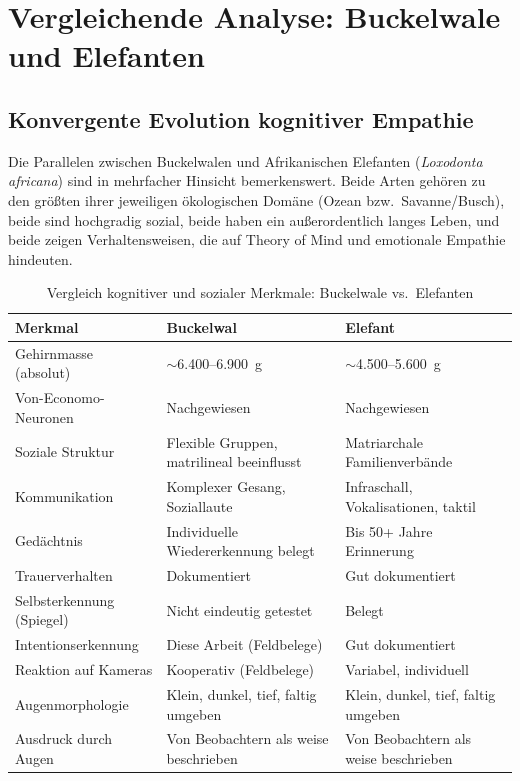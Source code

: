 ﻿\documentclass[12pt,a4paper]{article}
\theoremstyle{definition}
\theoremstyle{remark}
\begin{document}
\section{Vergleichende Analyse: Buckelwale und Elefanten}
\label{sec:elefanten}

\subsection{Konvergente Evolution kognitiver Empathie}

Die Parallelen zwischen Buckelwalen und Afrikanischen Elefanten
(\textit{Loxodonta africana}) sind in mehrfacher Hinsicht bemerkenswert.
Beide Arten gehören zu den größten ihrer jeweiligen ökologischen Domäne
(Ozean bzw.\ Savanne/Busch), beide sind hochgradig sozial, beide haben
ein außerordentlich langes Leben, und beide zeigen Verhaltensweisen, die auf
Theory of Mind und emotionale Empathie hindeuten.

\begin{table}[h]
  \centering
  \caption{Vergleich kognitiver und sozialer Merkmale: Buckelwale vs.\ Elefanten}
  \label{tab:vergleich}
  \begin{tabularx}{\textwidth}{lXX}
    \toprule
    \textbf{Merkmal} & \textbf{Buckelwal} & \textbf{Elefant} \\
    \midrule
    Gehirnmasse (absolut) & $\sim$6.400--6.900~g & $\sim$4.500--5.600~g \\
    Von-Economo-Neuronen & Nachgewiesen & Nachgewiesen \\
    Soziale Struktur & Flexible Gruppen, matrilineal beeinflusst &
      Matriarchale Familienverbände \\
    Kommunikation & Komplexer Gesang, Soziallaute & Infraschall, Vokalisationen, taktil \\
    Gedächtnis & Individuelle Wiedererkennung belegt & Bis 50+ Jahre Erinnerung \\
    Trauerverhalten & Dokumentiert & Gut dokumentiert \\
    Selbsterkennung (Spiegel) & Nicht eindeutig getestet & Belegt \\
    Intentionserkennung & Diese Arbeit (Feldbelege) & Gut dokumentiert \\
    Reaktion auf Kameras & Kooperativ (Feldbelege) & Variabel, individuell \\
    Augenmorphologie & Klein, dunkel, tief, faltig umgeben &
      Klein, dunkel, tief, faltig umgeben \\
    Ausdruck durch Augen & Von Beobachtern als weise beschrieben &
      Von Beobachtern als weise beschrieben \\
    \bottomrule
  \end{tabularx}
\end{table}
\end{document}
